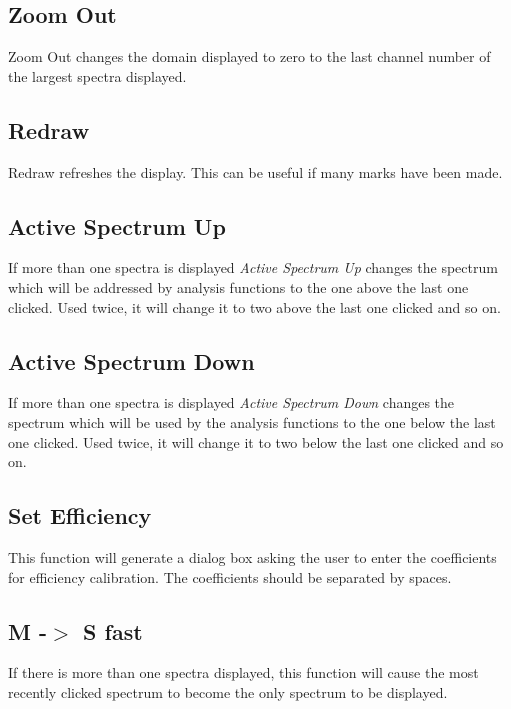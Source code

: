 \subsection{Zoom Out}

Zoom Out changes the domain displayed to zero to the last channel number of the largest spectra displayed.

\subsection{Redraw}

Redraw refreshes the display.  This can be useful if many marks have been made.

\subsection{Active Spectrum Up}

If more than one spectra is displayed {\it Active Spectrum Up} changes the spectrum which will be addressed by analysis functions to the one above the last one clicked.  Used twice, it will change it to two above the last one clicked and so on.

\subsection{Active Spectrum Down}

If more than one spectra is displayed {\it Active Spectrum Down} changes the spectrum which will be used by the analysis functions to the one below the last one clicked.  Used twice, it will change it to two below the last one clicked and so on.

\subsection{Set Efficiency}

This function will generate a dialog box asking the user to enter the coefficients for efficiency calibration.  The coefficients should be separated by spaces.

\subsection{M -$>$ S fast}

If there is more than one spectra displayed, this function will cause the most recently clicked spectrum to become the only spectrum to be displayed.

